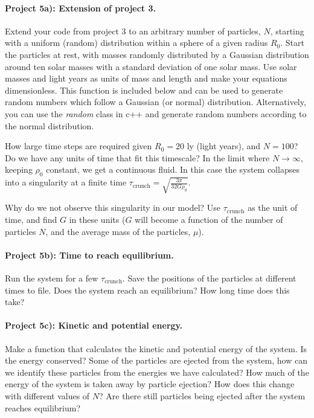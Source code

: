 \documentclass[%
oneside,                 %
final,                   %
10pt]{article}
\begin{document}
\paragraph{Project 5a): Extension of project 3.}
Extend your code from project 3 to an arbitrary number of particles, $N$,
  starting with a uniform (random) distribution within a sphere of a
  given radius $R_0$. Start the particles at rest, with masses
  randomly distributed by a Gaussian distribution around ten solar
  masses with a standard deviation of one solar mass. Use solar masses
  and light years as units of mass and length and make your equations dimensionless.
This function is included below and  can be used to generate 
random numbers which follow a Gaussian (or normal) distribution.  Alternatively, you can use 
the \emph{random} class in c++ and generate random numbers according to the normal distribution.

How large time steps are required given $R_0 = 20$ ly
(light years), and  $N = 100$? Do we have any units of time that fit
this timescale?   
In the limit where $N \rightarrow \infty$, keeping $\rho_0$ constant,
we get a continuous fluid. In this case the system collapses into a
singularity at a finite time $\tau_{\mathrm{crunch}} = \sqrt{\frac{3\pi}{32G\rho_0}}$. 

Why do we not observe this singularity in our model? Use
$\tau_{\mathrm{crunch}}$ as the unit of time, and find $G$ in these units ($G$
will become a function of the number of particles $N$, and the average
mass of the particles, $\mu$).

\paragraph{Project 5b): Time to reach equilibrium.}
Run the system for a few $\tau_{\mathrm{crunch}}$. Save the positions
  of the particles at different times to file. Does the system
  reach an equilibrium? How long time does this take?


\paragraph{Project 5c): Kinetic and potential energy.}
Make a function that calculates the kinetic and potential
  energy of the system. Is the energy conserved? Some of the
  particles are ejected from the system, how can we identify these
  particles from the energies we have calculated? How much of the
  energy of the system is taken away by particle ejection? How does
  this change with different values of $N$? Are there still particles
  being ejected after the system reaches equilibrium?
\end{document}
